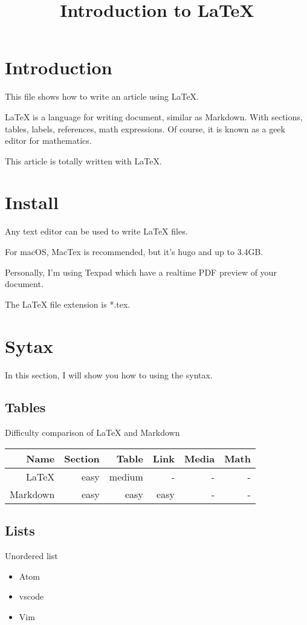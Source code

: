 \documentclass{article}
\title{Introduction to LaTeX}
\begin{document}
\section{Introduction}
This file shows how to write an article using LaTeX.

LaTeX is a language for writing document, similar as Markdown. With sections, tables, labels,
references, math expressions. Of course, it is known as a geek editor for mathematics.

This article is totally written with LaTeX.

\section{Install}

Any text editor can be used to write LaTeX files.

For macOS, MacTex is recommended, but it's hugo and up to 3.4GB. 

Personally, I'm using Texpad which have a realtime PDF preview of your document.

The LaTeX file extension is *.tex.

\section{Sytax}
In this section, I will show you how to using the syntax.

\subsection{Tables}

Difficulty comparison of LaTeX and Markdown

\begin{tabular}{r|r|r|r|r|r}
\hline
Name & Section & Table & Link & Media & Math\\
\hline
LaTeX & easy & medium & - & - & - \\
\hline
Markdown & easy & easy & easy & - & - \\
\hline
\end{tabular}

\subsection{Lists}\label{section-lists}

Unordered list

\begin{itemize}
	\item Atom
	\item vscode
	\item Vim
\end{itemize}
\end{document}
